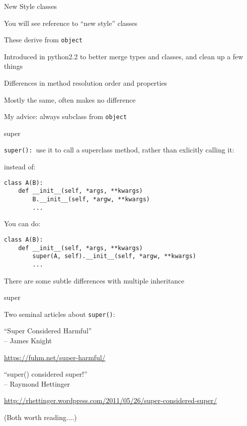 \documentclass{beamer}
\begin{document}
\begin{frame}[fragile]{New Style classes}

{\Large You will see reference to ``new style'' classes}

\vfill
{\Large These derive from \verb|object|}

\vfill
{\Large Introduced in python2.2 to better merge types and classes, and clean up a few things}

\vfill
{\Large Differences in method resolution order and properties}

\vfill
{\Large Mostly the same, often makes no difference}

\vfill
{\Large My advice: always subclass from \verb|object|}

\end{frame}

\begin{frame}[fragile]{super}

{\Large \verb|super(): |use it to call a superclass method, rather than exlicitly calling it:}

\vfill
{\large instead of:}
\begin{verbatim}
class A(B):
    def __init__(self, *args, **kwargs)
        B.__init__(self, *argw, **kwargs)
        ...
\end{verbatim}

{\large You can do:}
\begin{verbatim}
class A(B):
    def __init__(self, *args, **kwargs)
        super(A, self).__init__(self, *argw, **kwargs)
        ...
\end{verbatim}

\vfill
{\Large There are some subtle differences with multiple inheritance}

\end{frame}

\begin{frame}[fragile]{super}

{\Large Two seminal articles about \verb|super()|:}

\vfill
{\LARGE ``Super Considered Harmful''}\\[0.1in]
{\Large \hspace{0.5in}-- James Knight }

\vfill
\url{https://fuhm.net/super-harmful/}

\vfill
{\LARGE ``super() considered super!''}\\[0.1in]
{\Large  \hspace{0.5in}--  Raymond Hettinger }

\vfill
\url{http://rhettinger.wordpress.com/2011/05/26/super-considered-super/}
\vfill

{\large (Both worth reading....)}
\end{frame} 
\end{document}
